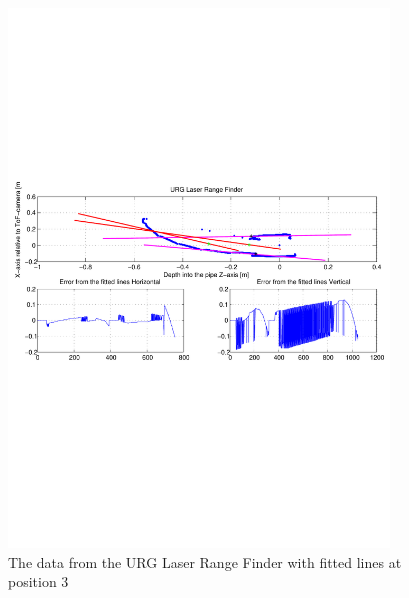 \begin{figure}[htbp]
    \centering
    \includegraphics[width=0.9\textwidth]{pics/pos21-control-urg-2d}
    \caption{The data from the URG Laser Range Finder with fitted lines at position 3}
    \label{chap7:fig-pos21-control-urg-2d}
\end{figure}
